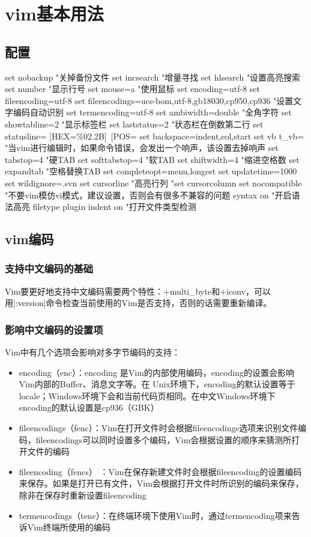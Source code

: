 \chapter{vim基本用法}

\section{配置}
\begin{code}
set nobackup "关掉备份文件
set incsearch "增量寻找
set hlsearch "设置高亮搜索
set number "显示行号
set mouse=a "使用鼠标
set encoding=utf-8
set fileencoding=utf-8
set fileencodings=ucs-bom,utf-8,gb18030,cp950,cp936 "设置文字编码自动识别
set termencoding=utf-8
set ambiwidth=double "全角字符
set showtabline=2 "显示标签栏
set laststatus=2 "状态栏在倒数第二行
set statusline=%
[HEX=\%02.2B]\ [POS=%
set backspace=indent,eol,start
set vb t_vb= "当vim进行编辑时，如果命令错误，会发出一个响声，该设置去掉响声
set tabstop=4 "硬TAB
set softtabstop=4 "软TAB
set shiftwidth=4 "缩进空格数
set expandtab "空格替换TAB
set completeopt=menu,longest
set updatetime=1000
set wildignore=.svn
set cursorline "高亮行列
"set cursorcolumn
set nocompatible "不要vim模仿vi模式，建议设置，否则会有很多不兼容的问题
syntax on "开启语法高亮
filetype plugin indent on "打开文件类型检测
\end{code}

\section{vim编码}
\subsection{支持中文编码的基础}
Vim要更好地支持中文编码需要两个特性：+multi\_byte和+iconv，可以用|:version|命令检查当前使用的Vim是否支持，否则的话需要重新编译。

\subsection{影响中文编码的设置项}
Vim中有几个选项会影响对多字节编码的支持：
\begin{itemize}
    \item encoding（enc）：encoding 是Vim的内部使用编码，encoding的设置会影响Vim内部的Buffer、消息文字等。在 Unix环境下，encoding的默认设置等于locale；Windows环境下会和当前代码页相同。在中文Windows环境下encoding的默认设置是cp936（GBK）
    \item fileencodings（fenc）：Vim在打开文件时会根据fileencodings选项来识别文件编码，fileencodings可以同时设置多个编码，Vim会根据设置的顺序来猜测所打开文件的编码
    \item fileencoding（fencs） ：Vim在保存新建文件时会根据fileencoding的设置编码来保存。如果是打开已有文件，Vim会根据打开文件时所识别的编码来保存，除非在保存时重新设置fileencoding
    \item termencodings（tenc）：在终端环境下使用Vim时，通过termencoding项来告诉Vim终端所使用的编码
\end{itemize}

